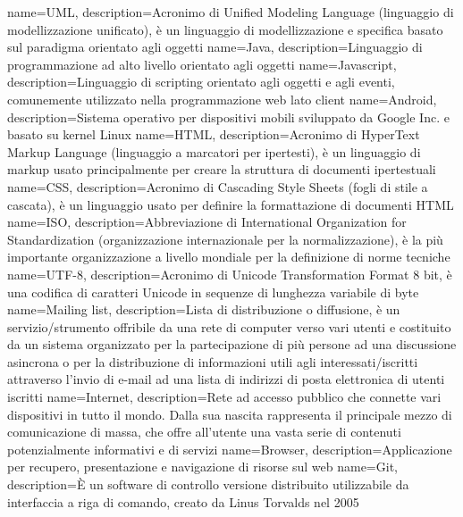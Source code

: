  {
	name=UML,
	description={Acronimo di Unified Modeling Language (linguaggio di modellizzazione
	unificato), è un linguaggio di modellizzazione e specifica basato sul paradigma
	orientato agli oggetti}
}
 {
	name=Java,
	description={Linguaggio di programmazione ad alto livello orientato agli oggetti}
}
 {
	name=Javascript,
	description={Linguaggio di scripting orientato agli oggetti e agli eventi,
	comunemente utilizzato nella programmazione web lato client}
}
 {
	name=Android,
	description={Sistema operativo per dispositivi mobili sviluppato da Google Inc. e basato su kernel Linux}
}
 {
	name=HTML,
	description={Acronimo di HyperText Markup Language (linguaggio a marcatori per
	ipertesti), è un linguaggio di markup usato principalmente per creare la
	struttura di documenti ipertestuali}
}
 {
	name=CSS,
	description={Acronimo di Cascading Style Sheets (fogli di stile a cascata), è un linguaggio usato per
	definire la formattazione di documenti HTML}
}
 {
	name=ISO,
	description={Abbreviazione di International Organization for Standardization (organizzazione internazionale per la
	normalizzazione), è la più importante organizzazione a livello mondiale per la definizione di norme tecniche}
}
 {
	name=UTF-8,
	description={Acronimo di Unicode Transformation Format 8 bit, è una codifica di caratteri Unicode in sequenze di
	lunghezza variabile di byte}
}
 {
	name=Mailing list,
	description={Lista di distribuzione o diffusione, è un servizio/strumento offribile da una rete di computer verso
	vari utenti e costituito da un sistema organizzato per la partecipazione di più persone ad una discussione asincrona
	o per la distribuzione di informazioni utili agli interessati/iscritti attraverso l'invio di e-mail ad una lista di
	indirizzi di posta elettronica di utenti iscritti}
}
 {
	name=Internet,
	description={Rete ad accesso pubblico che connette vari dispositivi in tutto il mondo. Dalla sua nascita rappresenta
	il principale mezzo di comunicazione di massa, che offre all'utente una vasta serie di contenuti potenzialmente
	informativi e di servizi}
}
 {
	name=Browser,
	description={Applicazione per recupero, presentazione e navigazione di risorse sul web}
}
 {
	name=Git,
	description={È un software di controllo versione distribuito utilizzabile da interfaccia a riga di comando, creato da Linus Torvalds nel 2005}
}
